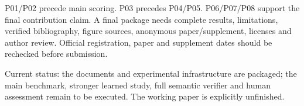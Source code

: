 \documentclass[
  11pt,
  a4paper,
]{article}
\begin{document}
P01/P02 precede main scoring. P03 precedes P04/P05. P06/P07/P08 support
the final contribution claim. A final package needs complete results,
limitations, verified bibliography, figure sources, anonymous
paper/supplement, licenses and author review. Official registration,
paper and supplement dates should be rechecked before submission.

Current status: the documents and experimental infrastructure are
packaged; the main benchmark, stronger learned study, full semantic
verifier and human assessment remain to be executed. The working paper
is explicitly unfinished.
\end{document}

